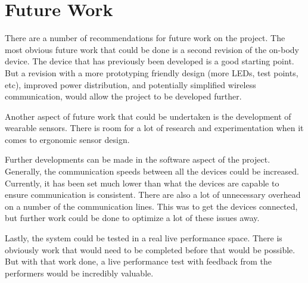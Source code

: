 \chapter{Future Work}
There are a number of recommendations for future work on the project.
The most obvious future work that could be done is a second revision of the on-body device.
The device that has previously been developed is a good starting point.
But a revision with a more prototyping friendly design (more LEDs, test points, etc),
improved power distribution, and potentially simplified wireless communication,
would allow the project to be developed further.

Another aspect of future work that could be undertaken is the development of wearable sensors.
There is room for a lot of research and experimentation when it comes to ergonomic sensor design.

Further developments can be made in the software aspect of the project.
Generally, the communication speeds between all the devices could be increased.
Currently, it has been set much lower than what the devices are capable to ensure communication is consistent.
There are also a lot of unnecessary overhead on a number of the communication lines.
This was to get the devices connected, but further work could be done to optimize a lot of these issues away.

Lastly, the system could be tested in a real live performance space.
There is obviously work that would need to be completed before that would be possible.
But with that work done, a live performance test with feedback from the performers would be incredibly valuable.
